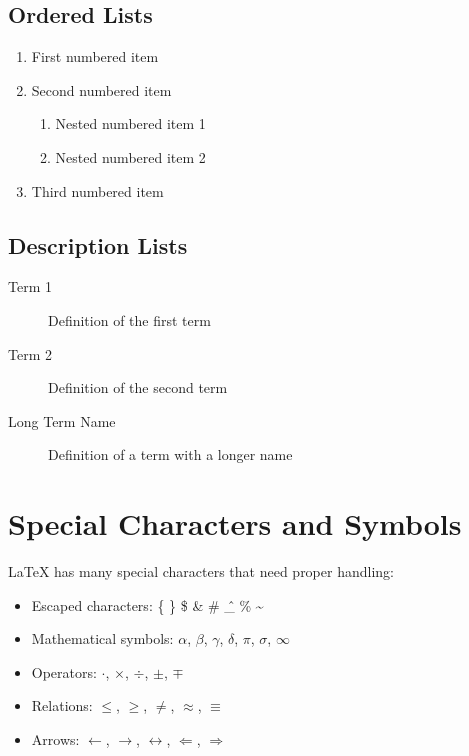 \documentclass[12pt,a4paper]{article}
\begin{document}
\subsection{Ordered Lists}

\begin{enumerate}
    \item First numbered item
    \item Second numbered item
    \begin{enumerate}
        \item Nested numbered item 1
        \item Nested numbered item 2
    \end{enumerate}
    \item Third numbered item
\end{enumerate}

\subsection{Description Lists}

\begin{description}
    \item[Term 1] Definition of the first term
    \item[Term 2] Definition of the second term
    \item[Long Term Name] Definition of a term with a longer name
\end{description}

\section{Special Characters and Symbols}

LaTeX has many special characters that need proper handling:

\begin{itemize}
    \item Escaped characters: \{ \} \$ \& \# \^ \_ \% \~
    \item Mathematical symbols: $\alpha$, $\beta$, $\gamma$, $\delta$, $\pi$, $\sigma$, $\infty$
    \item Operators: $\cdot$, $\times$, $\div$, $\pm$, $\mp$
    \item Relations: $\leq$, $\geq$, $\neq$, $\approx$, $\equiv$
    \item Arrows: $\leftarrow$, $\rightarrow$, $\leftrightarrow$, $\Leftarrow$, $\Rightarrow$
\end{itemize}
\end{document}
